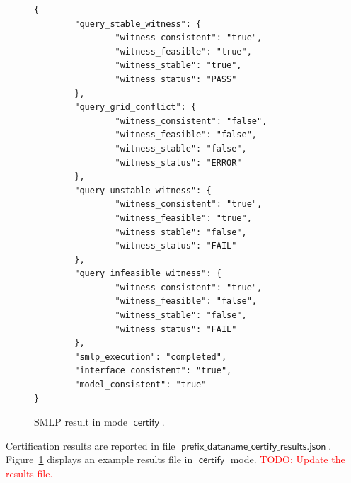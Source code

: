 \documentclass[a4paper,parskip=half]{article} %
\newcommand*\suffix[1]{\operatorname{\mathsf{#1}}} %
\newcommand*\mode[1]{\operatorname{\mathsf{#1}}} %
\newcommand\todozk[1]{\textcolor{red}{#1}}
\newcommand*\ZK{\todozk}
\begin{document}
\begin{figure}[tp]%
\small
\begin{verbatim}
{
        "query_stable_witness": {
                "witness_consistent": "true",
                "witness_feasible": "true",
                "witness_stable": "true",
                "witness_status": "PASS"
        },
        "query_grid_conflict": {
                "witness_consistent": "false",
                "witness_feasible": "false",
                "witness_stable": "false",
                "witness_status": "ERROR"
        },
        "query_unstable_witness": {
                "witness_consistent": "true",
                "witness_feasible": "true",
                "witness_stable": "false",
                "witness_status": "FAIL"
        },
        "query_infeasible_witness": {
                "witness_consistent": "true",
                "witness_feasible": "false",
                "witness_stable": "false",
                "witness_status": "FAIL"
        },
        "smlp_execution": "completed",
        "interface_consistent": "true",
        "model_consistent": "true"
}
\end{verbatim}
\caption{SMLP result in mode $\mode{certify}$.}
\label{fig:certify:result}
\end{figure}

Certification results are reported in file $\suffix{prefix\_dataname\_certify\_results.json}$.
Figure~\ref{fig:certify:result} displays an example results file in $\mode{certify}$ mode.
\ZK{TODO: Update the results file.}
\end{document}
